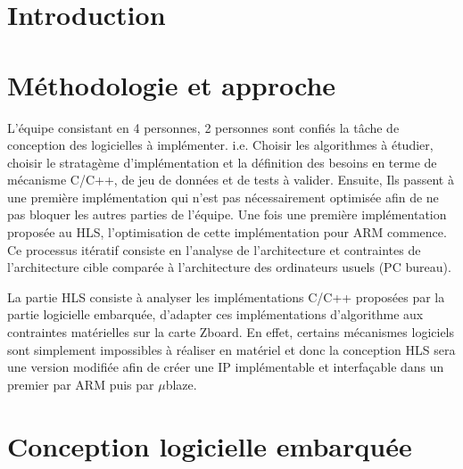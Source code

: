 \documentclass[12pt,a4paper]{article}
\author{\textbf{DOU Yuhan\\ FORCIOLI Quentin \\ GHAOUI Mohamed Anis\\  TERRACHER Audrey}}
\begin{document}

\newpage
\pagestyle{fancy}
\section{Introduction}


\section{Méthodologie et approche}
L'équipe consistant en 4 personnes, 2 personnes sont confiés la tâche de conception des logicielles à implémenter. i.e. Choisir les algorithmes à étudier, choisir le stratagème d'implémentation et la définition des besoins en terme de mécanisme C/C++, de jeu de données  et de tests à valider. Ensuite, Ils passent à une première implémentation qui n'est pas nécessairement optimisée afin de ne pas bloquer les autres parties de l'équipe. Une fois une première implémentation proposée au HLS, l'optimisation de cette implémentation pour ARM commence. Ce processus itératif consiste en l'analyse de l'architecture et contraintes de l'architecture cible comparée à l'architecture des ordinateurs usuels (PC bureau).


La partie HLS consiste à analyser les implémentations C/C++ proposées par la partie logicielle embarquée, d'adapter ces implémentations d'algorithme aux contraintes matérielles sur la carte Zboard. En effet, certains mécanismes logiciels sont simplement impossibles à réaliser en matériel et donc la conception HLS sera une version modifiée afin de créer une IP implémentable et interfaçable dans un premier par ARM puis par $\mu$blaze.

\section{Conception logicielle embarquée}


\end{document}

